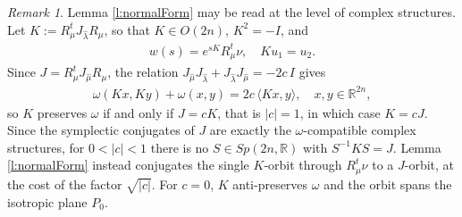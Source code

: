 \documentclass[11pt]{amsart}
\theoremstyle{plain}
\theoremstyle{definition}
\theoremstyle{remark}
\newtheorem{remark}[theorem]{Remark}
\numberwithin{equation}{section}
\def\R{{\mathbb R}}%
\numberwithin{equation}{section}
\begin{document}
\begin{remark}
    Lemma \ref{l:normalForm} may be read at the level of complex structures. Let $K:=R_\mu^tJ_{\hat{\lambda}}R_\mu$, so that $K\in O(2n)$, $K^2=-I$, and
    \begin{align*}
        w(s)=e^{sK}R_\mu^t\nu, \quad Ku_1=u_2.
    \end{align*}
    Since $J=R_\mu^tJ_{\hat{\mu}}R_\mu$, the relation $J_{\hat{\mu}}J_{\hat{\lambda}}+J_{\hat{\lambda}}J_{\hat{\mu}}=-2c\, I$ gives
    \begin{align*}
        \omega(Kx, Ky)+\omega(x, y)=2c\,\langle Kx, y\rangle, \quad x, y\in \R^{2n},
    \end{align*}
    so $K$ preserves $\omega$ if and only if $J=cK$, that is $|c|=1$, in which case $K=cJ$. Since the symplectic conjugates of $J$ are exactly the $\omega$-compatible complex structures, for $0<|c|<1$ there is no $S\in Sp(2n, \R)$ with $S^{-1}KS=J$. Lemma \ref{l:normalForm} instead conjugates the single $K$-orbit through $R_\mu^t\nu$ to a $J$-orbit, at the cost of the factor $\sqrt{|c|}$. For $c=0$, $K$ anti-preserves $\omega$ and the orbit spans the isotropic plane $P_0$. 
\end{remark}
\end{document}
